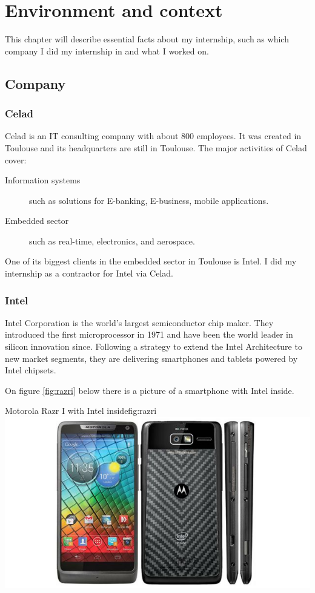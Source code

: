 \chapter{Environment and context}\label{chap:context}

\begin{sectionIntro}
    This chapter will describe essential facts about my internship, such as
    which company I did my internship in and what I worked on.
\end{sectionIntro}

\section{Company}

\subsection{Celad}
Celad is an IT consulting company with about 800 employees. It was created in Toulouse
and its headquarters are still in Toulouse.
The major activities of Celad cover:
\begin{description}
    \item [Information systems] such as solutions for E-banking, E-business, mobile applications.
    \item [Embedded sector] such as real-time, electronics, and aerospace.
\end{description}
One of its biggest clients in the embedded sector in Toulouse is Intel.
I did my internship as a contractor for Intel via Celad.

\subsection{Intel}
Intel Corporation is the world’s largest semiconductor chip maker. They
introduced the first microprocessor in 1971 and have been the world leader in
silicon innovation since.
Following a strategy to extend the Intel Architecture to new market segments,
they are delivering smartphones and tablets powered by Intel chipsets.

On figure \ref{fig:razri} below there is a picture of a smartphone with Intel inside.

\begin{figureGraphics}{Motorola Razr I with Intel inside}{fig:razri}
    \includegraphics[width=\textwidth]{./src/img/razri.jpg}
\end{figureGraphics}

